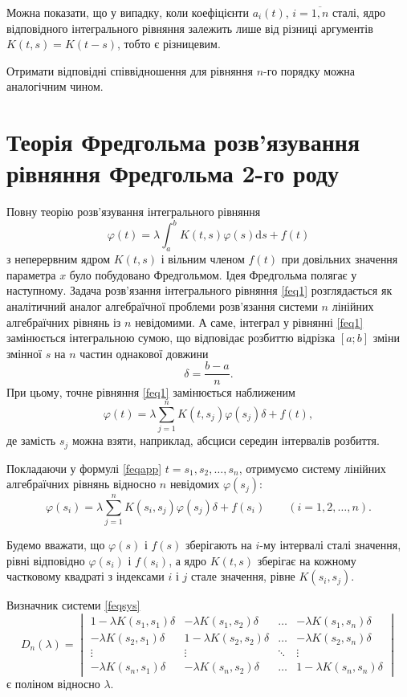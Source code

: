 \documentclass[14pt,twoside]{extreport}
\theoremstyle{mystyle}
\numberwithin{equation}{chapter}
\begin{document}
Можна показати, що у випадку, коли коефіцієнти $a_{i} (t)$, $i=\overline{1,n}$ сталі, ядро відповідного інтегрального рівняння залежить лише від різниці аргументів $K(t, s)= K(t-s)$, тобто є різницевим.

Отримати відповідні співвідношення для рівняння $n$-го порядку можна аналогічним чином.

\chapter{Теорія Фредгольма розв'язування рівняння Фредгольма 2-го роду}

Повну теорію розв'язування інтегрального рівняння
\begin{equation}\label{feq1}
 \displaystyle \varphi(t)=\lambda\int_{a}^{b}K(t, s)\varphi(s)\mathrm{d}s+f(t)
\end{equation}
з неперервним ядром $K(t, s)$ і вільним членом $f(t)$ при довільних значення параметра $x$ було побудовано Фредгольмом.
Ідея Фредгольма полягає у наступному. Задача розв'язання інтегрального рівняння \eqref{feq1} розглядається як аналітичний аналог алгебраїчної проблеми розв'язання системи $n$ лінійних алгебраїчних рівнянь із $n$ невідомими. А саме, інтеграл у рівнянні \eqref{feq1} замінюється інтегральною сумою, що відповідає розбиттю відрізка $[a; b]$ зміни змінної $s$ на $n$ частин однакової довжини
\[
 \delta=\frac{b-a}{n}.
\]
При цьому, точне рівняння \eqref{feq1} замінюється наближеним
\begin{equation} \label{feqapp}
 \displaystyle \varphi(t)=\lambda\sum_{j=1}^{n}K(t, s_{j})\varphi(s_{j})\delta+f(t),
\end{equation}
де замість $s_{j}$ можна взяти, наприклад, абсциси середин інтервалів розбиття.

Покладаючи у формулі \eqref{feqapp} $t= s_1, s_2, \ldots, s_n$, отримуємо систему лінійних алгебраїчних рівнянь відносно $n$ невідомих $\varphi(s_j)$:
\begin{equation}\label{feqsys}
 \displaystyle \varphi(s_i)=\lambda\sum_{j=1}^{n}K(s_{i}, s_{j})\varphi(s_{j})\delta + f(s_{i})\qquad (i=1, 2, \ldots, n).
\end{equation}

Будемо вважати, що $\varphi(s)$ і $f(s)$ зберігають на $i$-му інтервалі сталі значення, рівні відповідно $\varphi(s_i)$ і $f(s_i)$, а ядро $K(t, s)$ зберігає на кожному частковому квадраті з індексами $i$ і $j$ стале значення, рівне $K(s_i, s_j)$.

Визначник системи \eqref{feqsys}
\begin{equation}
D_n(\lambda)=
\begin{vmatrix}
1-\lambda K(s_1, s_1)\delta & -\lambda K(s_1, s_2)\delta & \ldots & -\lambda K(s_1, s_n)\delta\\
-\lambda K(s_2, s_1)\delta & 1-\lambda K(s_2, s_2)\delta & \ldots & -\lambda K(s_2, s_n)\delta\\
\vdots & \vdots & \ddots & \vdots \\
-\lambda K(s_n, s_1)\delta & -\lambda K(s_n, s_2)\delta & \ldots & 1-\lambda K(s_n, s_n)\delta
\end{vmatrix}
\end{equation}
є поліном відносно $\lambda$.
\end{document}

